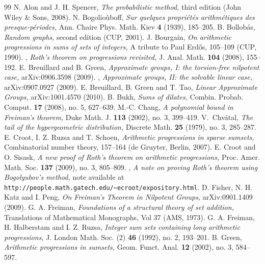 \documentclass[12pt,a4paper,reqno]{amsart}
\numberwithin{equation}{section}
\theoremstyle{plain}
\theoremstyle{definition}
\begin{document}
\begin{thebibliography}{99}
 N. Alon and J. H. Spencer, \emph{The probabilistic method,} third edition (John Wiley \& Sons, 2008).
 N. Bogolio\`uboff, \emph{Sur quelques propri\'et\'es arithm\'etiques des presque-p\'eriodes,} Ann. Chaire Phys. Math. Kiev \textbf{4} (1939), 185--205.
 B. Bollob\'as, \emph{Random graphs,} second edition (CUP, 2001).
 J. Bourgain, \emph{On arithmetic progressions in sums of sets of integers,} A tribute to Paul Erd\H{o}s, 105--109 (CUP, 1990).
 \bysame, \emph{Roth's theorem on progressions revisited,} J. Anal. Math. \textbf{104} (2008), 155--192.
 E. Breuillard and B. Green, \emph{Approximate groups, I: the torsion-free nilpotent case,} arXiv:0906.3598 (2009).
 \bysame, \emph{Approximate groups, II: the solvable linear case,} arXiv:0907.0927 (2009).
 E. Breuillard, B. Green and T. Tao, \emph{Linear Approximate Groups,} arXiv:1001.4570 (2010).
 B. Bukh, \emph{Sums of dilates,} Combin. Probab. Comput. \textbf{17} (2008), no. 5, 627--639.
 M.-C. Chang, \emph{A polynomial bound in Freiman's theorem,} Duke Math. J. \textbf{113} (2002), no. 3, 399--419.
 V.~Chv\'atal, \emph{The tail of the hypergeometric distribution,} Discrete Math. \textbf{25} (1979), no. 3, 285--287.
 E. Croot, I. Z. Ruzsa and T. Schoen, \emph{Arithmetic progressions in sparse sumsets,} Combinatorial number theory, 157--164 (de Gruyter, Berlin, 2007).
 E. Croot and O. Sisask, \emph{A new proof of Roth's theorem on arithmetic progressions,} Proc. Amer. Math. Soc. \textbf{137} (2009), no. 3, 805--809.
 \bysame, \emph{A note on proving Roth's theorem using Bogolyubov's method,} note available at \verb+http://people.math.gatech.edu/~ecroot/expository.html+.
 D. Fisher, N. H. Katz and I. Peng, \emph{On Freiman's Theorem in Nilpotent Groups,} arXiv:0901.1409 (2009).
 G. A. Freiman, \emph{Foundations of a structural theory of set addition,} Translations of Mathematical Monographs, Vol 37 (AMS, 1973).
 G. A. Freiman, H. Halberstam and I. Z. Ruzsa, \emph{Integer sum sets containing long arithmetic progressions,} J. London Math. Soc. (2) \textbf{46} (1992), no. 2, 193--201.
 B. Green, \emph{Arithmetic progressions in sumsets,} Geom. Funct. Anal. \textbf{12} (2002), no. 3, 584--597.

\end{thebibliography}
\end{document}
